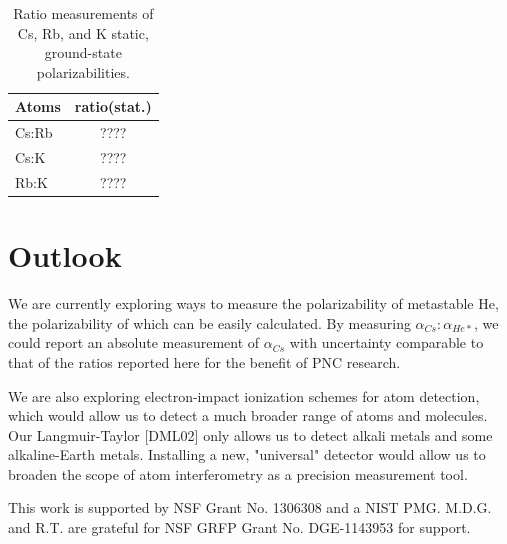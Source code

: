 \documentclass[twocolumn, prl,showpacs,superscriptaddress]{revtex4-1}   %
\begin{document}
\begingroup
\begin{table}
\caption{\label{tableRatio}Ratio measurements of Cs, Rb, and K static, ground-state polarizabilities.}
\begin{center}
\begin{tabular}{l c}
\hline\hline
Atoms & ratio(stat.) \\
\hline
Cs:Rb & ???? \\
Cs:K  & ???? \\
Rb:K  & ???? \\
\hline\hline
\end{tabular}
\end{center}
\end{table}
\endgroup


\section{Outlook}

We are currently exploring ways to measure the polarizability of metastable He, the polarizability of which can be easily calculated. By measuring $\alpha_{Cs}:\alpha_{He*}$, we could report an absolute measurement of $\alpha_{Cs}$ with uncertainty comparable to that of the ratios reported here for the benefit of PNC research.

We are also exploring electron-impact ionization schemes for atom detection, which would allow us to detect a much broader range of atoms and molecules. Our Langmuir-Taylor [DML02] only allows us to detect alkali metals and some alkaline-Earth metals. Installing a new, "universal" detector would allow us to broaden the scope of atom interferometry as a precision measurement tool. 










This work is supported by NSF Grant No. 1306308 and a NIST PMG. M.D.G. and R.T. are grateful for NSF GRFP Grant No. DGE-1143953 for support. 



\end{document}
